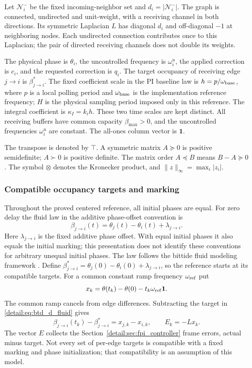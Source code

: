 Let $\mathcal N_i^-$ be the fixed incoming-neighbor set and
$d_i=|\mathcal N_i^-|$. The graph is connected, undirected and unit-weight,
with a receiving channel in both directions. Its symmetric Laplacian
$L$ has diagonal $d_i$ and off-diagonal $-1$ at neighboring nodes. Each
undirected connection contributes once to this Laplacian; the pair of
directed receiving channels does not double its weights.

The physical phase is $\theta_i$, the uncontrolled frequency is
$\omega_i^u$, the applied correction is $c_i$, and the requested correction
is $q_i$. The target occupancy of receiving edge $j\to i$ is
$\beta^*_{j\to i}$. The fixed coefficient scale in the PI baseline law is
$h=p/\omega_{\rm base}$, where $p$ is a local polling period and
$\omega_{\rm base}$ is the implementation reference frequency; $H$ is the
physical sampling period imposed only in this reference. The integral
coefficient is $\kappa_I=k_i h$. These two time scales are kept distinct.
All receiving buffers have common capacity $\beta_{\max}>0$, and the uncontrolled
frequencies $\omega_i^u$ are constant. The all-ones column vector is $\mathbf1$.

The transpose is denoted by $\top$. A symmetric matrix $A\succeq0$ is
positive semidefinite; $A\succ0$ is positive definite. The matrix order
$A\preceq B$ means $B-A\succeq0$. The symbol $\otimes$ denotes the
Kronecker product, and $\|z\|_\infty=\max_i|z_i|$.

\subsubsection{Compatible occupancy targets and marking}
Throughout the proved centered reference, all initial phases are equal.
For zero delay the fluid law in the additive phase-offset convention is
\begin{equation}
 \beta_{j\to i}(t)=\theta_j(t)-\theta_i(t)+\lambda_{j\to i}.
 \label{detail:eq:btd_d_fluid}
\end{equation}
Here $\lambda_{j\to i}$ is the fixed additive phase offset. With equal
initial phases it also equals the initial marking; this presentation does
not identify these conventions for arbitrary unequal initial phases.
The law follows the bittide fluid modeling framework
\cite{lall2024logicalSynchrony,lall2022resistance}. Define
$\beta^*_{j\to i}=\theta_j(0)-\theta_i(0)+\lambda_{j\to i}$, so the
reference starts at its compatible targets. For a common constant ramp
frequency $\omega_{\rm ref}$ put
\begin{equation}
 x_k=\theta(t_k)-\theta(0)-t_k\omega_{\rm ref}\mathbf1.
 \label{detail:eq:btd_ref_state}
\end{equation}
The common ramp cancels from edge differences. Subtracting the target in
\eqref{detail:eq:btd_d_fluid} gives
\begin{equation}
 \beta_{j\to i}(t_k)-\beta^*_{j\to i}=x_{j,k}-x_{i,k},\qquad E_k=-Lx_k.
 \label{detail:eq:btd_buffer_phase}
\end{equation}
The vector $E$ collects the Section~\ref{detail:sec:fpi_controller} frame errors, actual minus target.
Not every set of per-edge targets is compatible with a fixed marking and
phase initialization; that compatibility is an assumption of this model.

